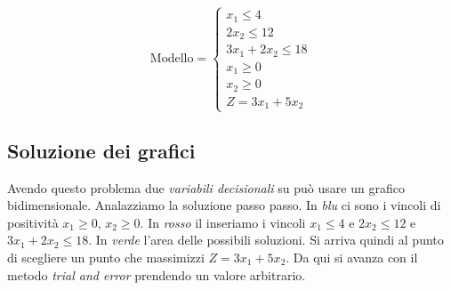 \documentclass{article}
\begin{document}
$$ \text{Modello}=
  \begin{cases}
    x_1 \le 4          \\
    2x_2 \le 12        \\
    3x_1 + 2x_2 \le 18 \\
    x_1 \ge 0          \\
    x_2 \ge 0          \\
    Z = 3x_1 + 5x_2
  \end{cases}
$$

\subsection{Soluzione dei grafici}
Avendo questo problema due \textit{variabili decisionali} su può usare un grafico bidimensionale. Analazziamo la soluzione passo passo. In \textit{blu} ci sono i vincoli di positività $x_1\ge0$, $x_2\ge0$. In \textit{rosso} il inseriamo i vincoli $x_1\le4$ e $2x_2\le12$ e $3x_1+2x_2\le18$. In \textit{verde} l'area delle possibili soluzioni. Si arriva quindi al punto di scegliere un punto che massimizzi $Z=3x_1+5x_2$. Da qui si avanza con il metodo \textit{trial and error} prendendo un valore arbitrario.
\end{document}
